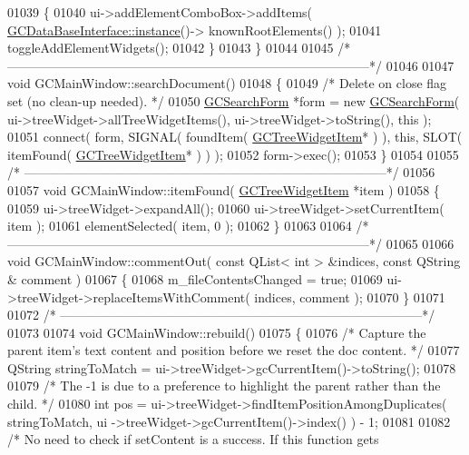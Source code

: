 \begin{DoxyCode}
{{{{{{01039   \{
01040     ui->addElementComboBox->addItems( \hyperlink{class_g_c_data_base_interface_a1baea9c0667aa8b610ec30076fcab84c}{GCDataBaseInterface::instance}()->
      knownRootElements() );
01041     toggleAddElementWidgets();
01042   \}
01043 \}
01044 
01045 \textcolor{comment}{/*
      --------------------------------------------------------------------------------------*/}
01046 
01047 \textcolor{keywordtype}{void} GCMainWindow::searchDocument()
01048 \{
01049   \textcolor{comment}{/* Delete on close flag set (no clean-up needed). */}
01050   \hyperlink{class_g_c_search_form}{GCSearchForm} *form = \textcolor{keyword}{new} \hyperlink{class_g_c_search_form}{GCSearchForm}( ui->treeWidget->allTreeWidgetItems(), 
      ui->treeWidget->toString(), this );
01051   connect( form, SIGNAL( foundItem( \hyperlink{class_g_c_tree_widget_item}{GCTreeWidgetItem}* ) ), \textcolor{keyword}{this}, SLOT( 
      itemFound( \hyperlink{class_g_c_tree_widget_item}{GCTreeWidgetItem}* ) ) );
01052   form->exec();
01053 \}
01054 
01055 \textcolor{comment}{/*
      --------------------------------------------------------------------------------------*/}
01056 
01057 \textcolor{keywordtype}{void} GCMainWindow::itemFound( \hyperlink{class_g_c_tree_widget_item}{GCTreeWidgetItem} *item )
01058 \{
01059   ui->treeWidget->expandAll();
01060   ui->treeWidget->setCurrentItem( item );
01061   elementSelected( item, 0 );
01062 \}
01063 
01064 \textcolor{comment}{/*
      --------------------------------------------------------------------------------------*/}
01065 
01066 \textcolor{keywordtype}{void} GCMainWindow::commentOut( \textcolor{keyword}{const} QList< int > &indices, \textcolor{keyword}{const} QString &
      comment )
01067 \{
01068   m\_fileContentsChanged = \textcolor{keyword}{true};
01069   ui->treeWidget->replaceItemsWithComment( indices, comment );
01070 \}
01071 
01072 \textcolor{comment}{/*
      --------------------------------------------------------------------------------------*/}
01073 
01074 \textcolor{keywordtype}{void} GCMainWindow::rebuild()
01075 \{
01076   \textcolor{comment}{/* Capture the parent item's text content and position before we reset the
       doc content. */}
01077   QString stringToMatch = ui->treeWidget->gcCurrentItem()->toString();
01078 
01079   \textcolor{comment}{/* The -1 is due to a preference to highlight the parent rather than the
       child. */}
01080   \textcolor{keywordtype}{int} pos = ui->treeWidget->findItemPositionAmongDuplicates( stringToMatch, ui
      ->treeWidget->gcCurrentItem()->index() ) - 1;
01081 
01082   \textcolor{comment}{/* No need to check if setContent is a success.  If this function gets
}}}}}}}
\end{DoxyCode}
